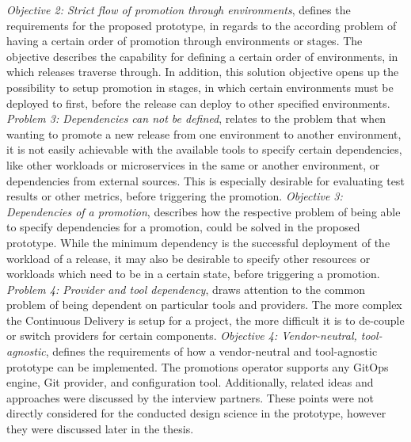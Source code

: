\textit{Objective 2: Strict flow of promotion through environments},
defines the requirements for the proposed prototype,
in regards to the according problem of having a certain order of promotion through environments or stages.
The objective describes the capability for defining a certain order of environments, in which releases traverse through.
In addition, this solution objective opens up the possibility to setup promotion in stages, in which
certain environments must be deployed to first, before the release can deploy to other specified environments.
%
\textit{Problem 3: Dependencies can not be defined},
relates to the problem that when wanting to promote a new release from one environment to another environment,
it is not easily achievable with the available tools to specify certain dependencies, like other workloads or
microservices in the same or another environment, or dependencies from external sources.
This is especially desirable for evaluating test results or other metrics, before triggering the promotion.
\textit{Objective 3: Dependencies of a promotion},
describes how the respective problem of being able to specify dependencies for a promotion,
could be solved in the proposed prototype. While the minimum dependency is the successful deployment
of the workload of a release,
it may also be desirable to specify other resources or workloads which need to be in a certain state,
before triggering a promotion.
%
\textit{Problem 4: Provider and tool dependency},
draws attention to the common problem of being dependent on particular tools and providers.
The more complex the Continuous Delivery is setup for a project,
the more difficult it is to de-couple or switch providers for certain components.
\textit{Objective 4: Vendor-neutral, tool-agnostic},
defines the requirements of how a vendor-neutral and tool-agnostic prototype can be implemented.
The promotions operator supports any GitOps engine, Git provider, and configuration tool.
%
Additionally,
related ideas and approaches were discussed by the interview partners.
These points were not directly considered for the conducted design science in the prototype,
however they were discussed later in the thesis.

